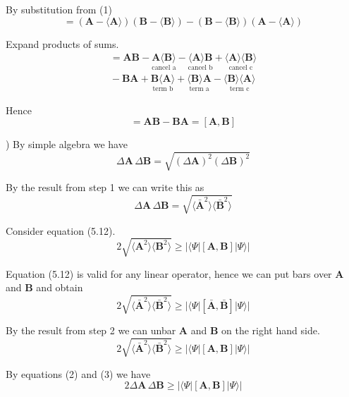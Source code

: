 By substitution from (1)
\begin{equation*}
[\bar{\mathbf A},\bar{\mathbf B}]
=(\mathbf A-\langle\mathbf A\rangle)(\mathbf B-\langle\mathbf B\rangle)
-(\mathbf B-\langle\mathbf B\rangle)(\mathbf A-\langle\mathbf A\rangle)
\end{equation*}

Expand products of sums.
\begin{multline*}
[\bar{\mathbf A},\bar{\mathbf B}]
=\mathbf A\mathbf B
-\underset{\text{cancel a}}{\mathbf A\langle\mathbf B\rangle}
-\underset{\text{cancel b}}{\langle\mathbf A\rangle\mathbf B}
+\underset{\text{cancel c}}{\langle\mathbf A\rangle\langle\mathbf B\rangle}
\\
{}-\mathbf B\mathbf A
+\underset{\text{term b}}{\mathbf B\langle\mathbf A\rangle}
+\underset{\text{term a}}{\langle\mathbf B\rangle\mathbf A}
-\underset{\text{term c}}{\langle\mathbf B\rangle\langle\mathbf A\rangle}
\end{multline*}

Hence
\begin{equation*}
[\bar{\mathbf A},\bar{\mathbf B}]=\mathbf A\mathbf B-\mathbf B\mathbf A=[\mathbf A,\mathbf B]
\end{equation*}

) By simple algebra we have
\begin{equation*}
\Delta\mathbf A\,\Delta\mathbf B
=\sqrt{(\Delta\mathbf A)^2(\Delta\mathbf B)^2}
\end{equation*}

By the result from step 1 we can write this as
\begin{equation*}
\Delta\mathbf A\,\Delta\mathbf B
=\sqrt{\langle\bar{\mathbf A}^2\rangle\langle\bar{\mathbf B}^2\rangle}
\tag{2}
\end{equation*}

Consider equation (5.12).
\begin{equation*}
2\sqrt{\langle\mathbf A^2\rangle\langle\mathbf B^2\rangle}
\ge|\langle\Psi|[\mathbf A,\mathbf B]|\Psi\rangle|
\tag{5.12}
\end{equation*}

Equation (5.12) is valid for any linear operator, hence we can put bars over
$\mathbf A$ and $\mathbf B$ and obtain
\begin{equation*}
2\sqrt{\langle\bar{\mathbf A}^2\rangle\langle\bar{\mathbf B}^2\rangle}
\ge|\langle\Psi|[\bar{\mathbf A},\bar{\mathbf B}]|\Psi\rangle|
\end{equation*}

By the result from step 2 we can unbar $\mathbf A$ and $\mathbf B$ on the right hand side.
\begin{equation*}
2\sqrt{\langle\bar{\mathbf A}^2\rangle\langle\bar{\mathbf B}^2\rangle}
\ge|\langle\Psi|[\mathbf A,\mathbf B]|\Psi\rangle|
\tag{3}
\end{equation*}

By equations (2) and (3) we have
\begin{equation*}
2\Delta\mathbf A\,\Delta\mathbf B
\ge|\langle\Psi|[\mathbf A,\mathbf B]|\Psi\rangle|
\end{equation*}


